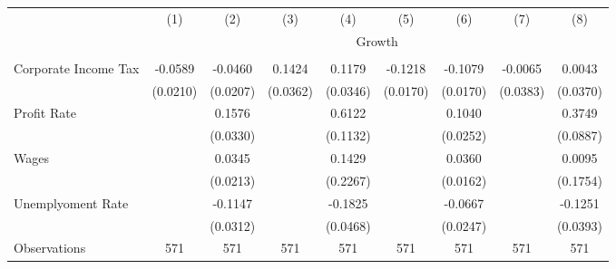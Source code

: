 \begin{tabular}{lcccccccc} \\ \hline 
                    &\multicolumn{1}{c}{(1)}         &\multicolumn{1}{c}{(2)}         &\multicolumn{1}{c}{(3)}         &\multicolumn{1}{c}{(4)}         &\multicolumn{1}{c}{(5)}         &\multicolumn{1}{c}{(6)}         &\multicolumn{1}{c}{(7)}         &\multicolumn{1}{c}{(8)}         \\
& \multicolumn{8}{c}{Growth} \\ \hline &  &  &  &  &  &  &  &  &  \\
Corporate Income Tax&     -0.0589\sym{***}&     -0.0460\sym{**} &      0.1424\sym{***}&      0.1179\sym{***}&     -0.1218\sym{***}&     -0.1079\sym{***}&     -0.0065         &      0.0043         \\
                    &    (0.0210)         &    (0.0207)         &    (0.0362)         &    (0.0346)         &    (0.0170)         &    (0.0170)         &    (0.0383)         &    (0.0370)         \\
\addlinespace
Profit Rate         &                     &      0.1576\sym{***}&                     &      0.6122\sym{***}&                     &      0.1040\sym{***}&                     &      0.3749\sym{***}\\
                    &                     &    (0.0330)         &                     &    (0.1132)         &                     &    (0.0252)         &                     &    (0.0887)         \\
\addlinespace
Wages               &                     &      0.0345         &                     &      0.1429         &                     &      0.0360\sym{**} &                     &      0.0095         \\
                    &                     &    (0.0213)         &                     &    (0.2267)         &                     &    (0.0162)         &                     &    (0.1754)         \\
\addlinespace
Unemplyoment Rate   &                     &     -0.1147\sym{***}&                     &     -0.1825\sym{***}&                     &     -0.0667\sym{***}&                     &     -0.1251\sym{***}\\
                    &                     &    (0.0312)         &                     &    (0.0468)         &                     &    (0.0247)         &                     &    (0.0393)         \\
\arrayrulecolor{black!10}\midrule
Observations        &         571         &         571         &         571         &         571         &         571         &         571         &         571         &         571         \\

\end{tabular}
